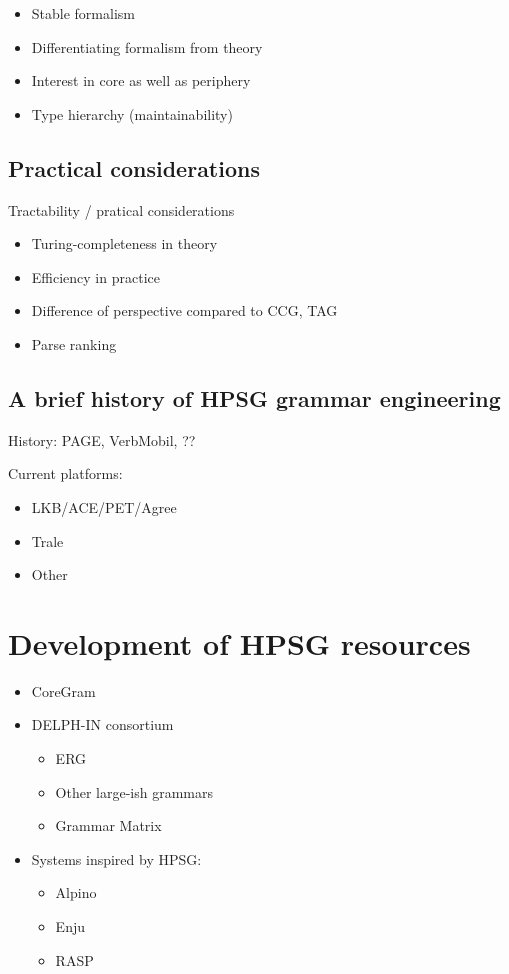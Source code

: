 \documentclass[output=paper]{langsci/langscibook}
\begin{document}
    \begin{itemize}
    \item Stable formalism
    \item Differentiating formalism from theory
    \item Interest in core as well as periphery
    \item Type hierarchy (maintainability)
    \end{itemize}


\subsection{Practical considerations}

Tractability / pratical considerations  %

    \begin{itemize}
    \item Turing-completeness in theory
    \item Efficiency in practice
    \item Difference of perspective compared to CCG, TAG
    \item Parse ranking
    \end{itemize}

\subsection{A brief history of HPSG grammar engineering}

History: PAGE, VerbMobil, ?? %

Current platforms:
    \begin{itemize}
    \item LKB/ACE/PET/Agree
    \item Trale
    \item Other
    \end{itemize}


\section{Development of HPSG resources}
\label{sec:resources}


\begin{itemize}
 \item  CoreGram
 \item  DELPH-IN consortium
    \begin{itemize}
    \item ERG
    \item Other large-ish grammars
    \item Grammar Matrix
    \end{itemize}
 \item Systems inspired by HPSG:
   \begin{itemize}
     \item Alpino
     \item Enju
     \item RASP
   \end{itemize}
\end{itemize}
\end{document}
